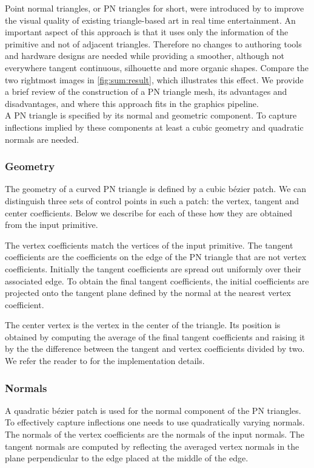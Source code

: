 \noindent Point normal triangles, or PN triangles for short, were introduced by \textcite{vlachos2001curved} to improve the visual quality of existing triangle-based art in real time entertainment. An important aspect of this approach is that it uses only the information of the primitive and not of adjacent triangles. Therefore no changes to authoring tools and hardware designs are needed while providing a smoother, although not everywhere tangent continuous, silhouette and more organic shapes. Compare the two rightmost images in \cref{fig:sum:result}, which illustrates this effect. We provide a brief review of the construction of a PN triangle mesh, its advantages and disadvantages, and where this approach fits in the graphics pipeline.\\

A PN triangle is specified by its normal and geometric component. To capture inflections implied by these components at least a cubic geometry and quadratic normals are needed.

\subsubsection*{Geometry}
The geometry of a curved PN triangle is defined by a cubic b\'ezier patch. We can distinguish three sets of control points in such a patch: the vertex, tangent and center coefficients. Below we describe for each of these how they are obtained from the input primitive. 

The vertex coefficients match the vertices of the input primitive. The tangent coefficients are the coefficients on the edge of the PN triangle that are not vertex coefficients. Initially the tangent coefficients are spread out uniformly over their associated edge. To obtain the final tangent coefficients, the initial coefficients are projected onto the tangent plane defined by the normal at the nearest vertex coefficient. 

The center vertex is the vertex in the center of the triangle. Its position is obtained by computing the average of the final tangent coefficients and raising it by the the difference between the tangent and vertex coefficients divided by two. We refer the reader to \textcite{vlachos2001curved} for the implementation details.

\subsubsection*{Normals}
A quadratic b\'ezier patch is used for the normal component of the PN triangles. To effectively capture inflections one needs to use quadratically varying normals. The normals of the vertex coefficients are the normals of the input normals. The tangent normals are computed by reflecting the averaged vertex normals in the plane perpendicular to the edge placed at the middle of the edge. 

